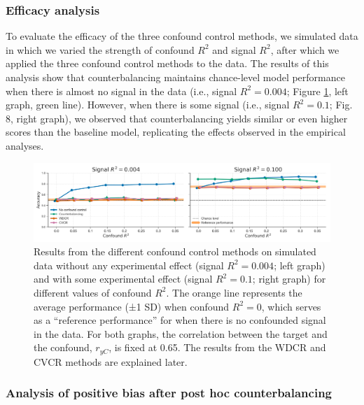 \documentclass[12pt,american,a4paper,oneside,]{memoir} %
\begin{document}
\hypertarget{confounds-decoding-results-cb-efficacy}{%
\subsubsection{Efficacy analysis}\label{confounds-decoding-results-cb-efficacy}}

To evaluate the efficacy of the three confound control methods, we simulated data in which we varied the strength of confound \(R^2\) and signal \(R^2\), after which we applied the three confound control methods to the data. The results of this analysis show that counterbalancing maintains chance-level model performance when there is almost no signal in the data (i.e., signal \(R^2 = 0.004\); Figure \ref{fig:fig-confounds-decoding-8}, left graph, green line). However, when there is some signal (i.e., signal \(R^2 = 0.1\); Fig. 8, right graph), we observed that counterbalancing yields similar or even higher scores than the baseline model, replicating the effects observed in the empirical analyses.

\begin{figure}
\centering
\includegraphics{_bookdown_files/confounds-decoding-files/figures/figure_8.pdf}
\caption{\label{fig:fig-confounds-decoding-8}Results from the different confound control methods on simulated data without any experimental effect (signal \(R^2 = 0.004\); left graph) and with some experimental effect (signal \(R^2 = 0.1\); right graph) for different values of confound \(R^2\). The orange line represents the average performance (±1 SD) when confound \(R^2 = 0\), which serves as a ``reference performance'' for when there is no confounded signal in the data. For both graphs, the correlation between the target and the confound, \(r_{yC}\), is fixed at 0.65. The results from the WDCR and CVCR methods are explained later.}
\end{figure}



\hypertarget{analysis-of-positive-bias-after-post-hoc-counterbalancing-1}{%
\subsubsection{Analysis of positive bias after post hoc counterbalancing}\label{analysis-of-positive-bias-after-post-hoc-counterbalancing-1}}
\end{document}
